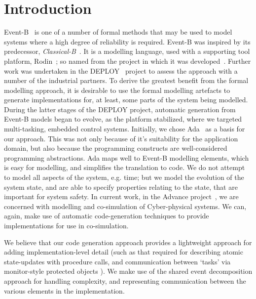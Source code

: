 \section{Introduction}\label{intro}
Event-B~\cite{ABR10} is one of a number of formal methods that may be used to model systems where a high degree of reliability is required. Event-B was inspired by its predecessor, \emph{Classical-B}~\cite{TheBBook}. It is a modelling language, used with a supporting tool platform, Rodin~\cite{abrial10rodin}; so named from the project in which it was developed~\cite{RodinTool}. Further work was undertaken in the DEPLOY~\cite{DEPLOY} project to assess the approach with a number of the industrial partners. To derive the greatest benefit from the formal modelling approach, it is desirable to use the formal modelling artefacts to generate implementations for, at least, some parts of the system being modelled. During the latter stages of the DEPLOY project, automatic generation from Event-B models began to evolve, as the platform stabilized, where we targeted multi-tasking, embedded control systems. Initially, we chose Ada~\cite{ada2005} as a basis for our approach. This was not only because of it's suitability for the application domain, but also because the programming constructs are well-considered programming abstractions. Ada maps well to Event-B modelling elements, which is easy for modelling, and simplifies the translation to code. We do not attempt to model all aspects of the system, e.g. time; but we model the evolution of the system state, and are able to specify properties relating to the state, that are important for system safety. In current work, in the Advance project~\cite{advance}, we are concerned with modelling and co-simulation of Cyber-physical systems. We can, again, make use of automatic code-generation techniques to provide implementations for use in co-simulation.    

We believe that our code generation approach provides a lightweight approach for adding implementation-level detail (such as that required for describing atomic state-updates with procedure calls, and communication between `tasks' via monitor-style protected objects ). We make use of the shared event decomposition approach for handling complexity, and representing communication between the  various elements in the implementation. 


